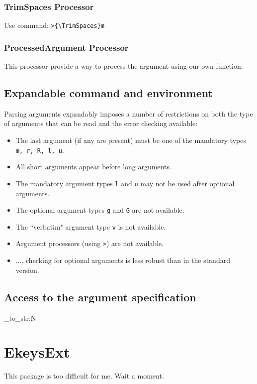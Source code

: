 \documentclass[oneside]{book}
\begin{document}
\subsection{TrimSpaces Processor}
Use command: \verb|>{\TrimSpaces}m|


\subsection{ProcessedArgument Processor}
This processor provide a way to process the argument using our own function.


\section{Expandable command and environment}
Parsing arguments expandably imposes a number of restrictions on both the type of
arguments that can be read and the error checking available:
\begin{itemize}
  \item The last argument (if any are present) must be one of the mandatory types \texttt{m, r, R, l, u}.
  \item All short arguments appear before long arguments.
  \item The mandatory argument types \texttt{l} and \texttt{u} may not be used after optional arguments.
  \item The optional argument types \texttt{g} and \texttt{G} are not available.
  \item The ``verbatim" argument type \texttt{v} is not available.
  \item Argument processors (using \texttt{>}) are not available.
  \item ..., checking for optional arguments is less robust than in the standard version.
\end{itemize}

\section{Access to the argument specification}
\begin{code}
\ExplSyntaxOn
\NewDocumentCommand{}
\GetDocumentCommandArgSpec \foo
\tl_to_str:N \ArgumentSpecification
\ExplSyntaxOff
\end{code}


\chapter{EkeysExt}
This package is too difficult for me. Wait a moment.
\end{document}
